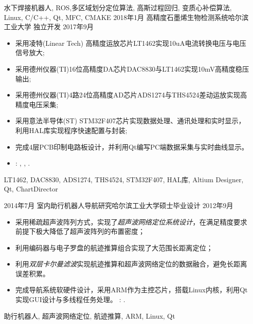 \begin{experiences}
{\begin{itemize}
          \end{itemize}
        }
        {水下焊接机器人, ROS,多区域划分定位算法, 高斯过程回归, 变质心补偿算法, Linux, C/C++, Qt, MFC, CMAKE}
  \emptySeparator
  \experience
    {2018年1月} {高精度石墨烯生物检测系统}{哈尔滨工业大学}{ 独立开发}
    {2017年9月}    {
		\begin{itemize}
			\item 采用凌特(Linear Tech) 高精度运放芯片LT1462实现10uA电流转换电压与电压信号放大;
			\item 采用德州仪器(TI)16位高精度DA芯片DAC8830与LT1462实现10mV高精度稳压输出; 
			\item 采用德州仪器(TI)4路24位高精度AD芯片ADS1274与THS4524差动运放实现高精度电压采集;
			\item 采用意法半导体(ST) STM32F407芯片实现数据处理、通讯处理和实时显示，利用HAL库实现程序快速配置与封装;                    
			\item 完成4层PCB印制电路板设计，并利用Qt编写PC端数据采集与实时曲线显示。 
			\item \faGithub:
			,
			,
			.                                                              
		\end{itemize}
		}
		{LT1462, DAC8830, ADS1274, THS4524, STM32F407, HAL库, Altium Designer, Qt, ChartDirector}

	\emptySeparator
	\experience
	{2014年7月} {室内助行机器人导航研究}{哈尔滨工业大学}{硕士毕业设计}
	{2012年9月}    {
	   	\begin{itemize}
	   		\item 采用稀疏超声波阵列方式，实现了\emph{超声波网络定位系统设计}，在满足精度要求前提下极大降低了超声波阵列的布置密度；
	   		\item 利用编码器与电子罗盘的航迹推算组合实现了大范围长距离定位；
	   		\item 利用\emph{双层卡尔曼滤波}实现航迹推算和超声波网络定位的数据融合，避免长距离误差积累。
	   		\item 完成导航系统软硬件设计，采用ARM作为主控芯片，搭载Linux内核，利用Qt实现GUI设计与多线程任务处理。 \faGithub: .	 		
	   		
	   	\end{itemize}
	}
	{助行机器人, 超声波网络定位, 航迹推算, ARM, Linux, Qt}
	

\end{experiences}
